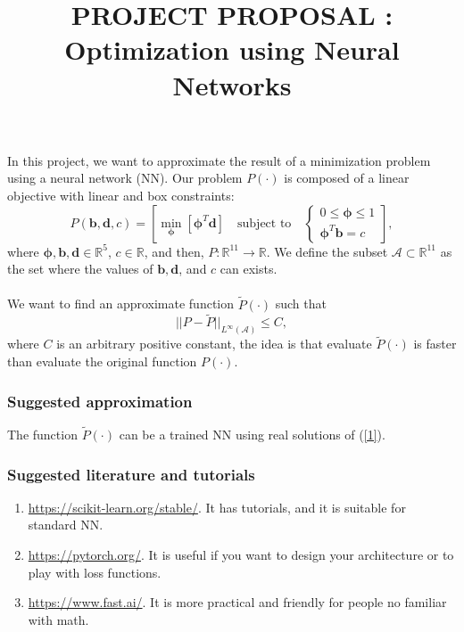 \documentclass[12pt]{article}
\theoremstyle{definition}
\theoremstyle{remark}
\newcommand{\R}{\mathbb{R}}
\begin{document}
\title{PROJECT PROPOSAL	:\\
Optimization using Neural Networks}
\date{}
\maketitle

In this project, we want to approximate the result of a minimization problem using a neural network (NN). Our problem $P(\cdot)$ is composed of a linear objective with linear and box constraints:
\begin{equation}
P(\bm{b,d},c)=\left[\min_{\bm{\phi}}\left[\bm{\phi}^T\bm{d}\right]\quad\text{subject to}\quad\begin{cases}
0\leq\bm{\phi}\leq1\\
\bm{\phi}^T\bm{b}=c
\end{cases}\right],
\label{1}
\end{equation}
where $\bm{\phi,b,d}\in\R^5$, $c\in\R$, and then, $P:\R^{11}\to\R$. We define the subset $\mathcal{A}\subset\R^{11}$ as the set where the values of $\bm{b,d}$, and $c$ can exists.\\
\quad\\
We want to find an approximate function $\tilde{P}(\cdot)$ such that
\begin{equation*}
||P-\tilde{P}||_{L^{\infty}(\mathcal{A})}\leq C,
\end{equation*}
where $C$ is an arbitrary positive constant, the idea is that evaluate $\tilde{P}(\cdot)$ is faster than evaluate the original function $P(\cdot)$.

\subsubsection*{Suggested approximation}

The function $\tilde{P}(\cdot)$ can be a trained NN using real solutions of (\ref{1}).

\subsubsection*{Suggested literature and tutorials}

\begin{enumerate}

\item \url{https://scikit-learn.org/stable/}. {\color{blue} It has tutorials, and it is suitable for standard NN.}

\item \url{https://pytorch.org/}. {\color{blue} It is useful if you want to design your architecture or to play with loss functions.}

\item \url{https://www.fast.ai/}. {\color{blue} It is more practical and friendly for people no familiar with math.}

\end{enumerate}
\end{document}
